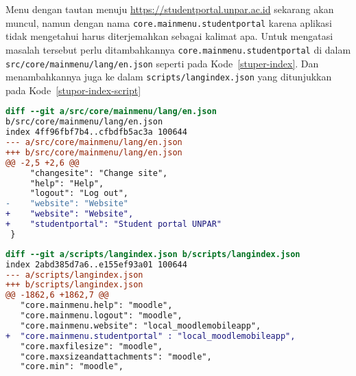 Menu dengan tautan menuju \url{https://studentportal.unpar.ac.id} sekarang akan muncul, namun dengan nama \texttt{core.mainmenu.studentportal} karena aplikasi tidak mengetahui harus diterjemahkan sebagai kalimat apa. Untuk mengatasi masalah tersebut perlu ditambahkannya \texttt{core.mainmenu.studentportal} di dalam \texttt{src/core/mainmenu/lang/en.json} seperti pada \mbox{Kode \ref{stuper-index}}. Dan menambahkannya juga ke dalam \texttt{scripts/langindex.json} yang ditunjukkan pada  \mbox{Kode \ref{stupor-index-script}}

\begin{lstlisting}[language=diff, frame=single, label ={stupor-index}, caption = Menambahkan \texttt{core.mainmenu.studentportal} pada file  \texttt{src/core/mainmenu/lang/en.json} ]
diff --git a/src/core/mainmenu/lang/en.json 
b/src/core/mainmenu/lang/en.json
index 4ff96fbf7b4..cfbdfb5ac3a 100644
--- a/src/core/mainmenu/lang/en.json
+++ b/src/core/mainmenu/lang/en.json
@@ -2,5 +2,6 @@
     "changesite": "Change site",
     "help": "Help",
     "logout": "Log out",
-    "website": "Website"
+    "website": "Website", 
+    "studentportal": "Student portal UNPAR"
 }
\end{lstlisting} 

\begin{lstlisting}[language=diff, frame=single, label ={stupor-index-script}, caption = Menambahkan \texttt{core.mainmenu.studentportal} pada file  \texttt{scripts/langindex.json} ]
diff --git a/scripts/langindex.json b/scripts/langindex.json
index 2abd385d7a6..e155ef93a01 100644
--- a/scripts/langindex.json
+++ b/scripts/langindex.json
@@ -1862,6 +1862,7 @@
   "core.mainmenu.help": "moodle",
   "core.mainmenu.logout": "moodle",
   "core.mainmenu.website": "local_moodlemobileapp",
+  "core.mainmenu.studentportal" : "local_moodlemobileapp",
   "core.maxfilesize": "moodle",
   "core.maxsizeandattachments": "moodle",
   "core.min": "moodle",
\end{lstlisting} 
